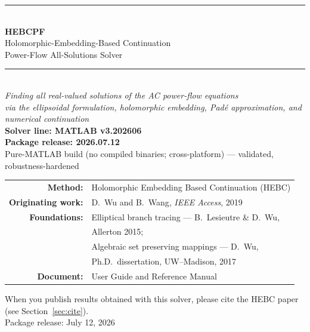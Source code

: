 \documentclass[11pt,a4paper]{article}
\begin{document}
\begin{titlepage}
\centering
\vspace*{2.2cm}
{\color{rule}\rule{\textwidth}{1.2pt}}\\[8pt]
{\Huge\bfseries HEBCPF}\\[10pt]
{\LARGE Holomorphic-Embedding-Based Continuation}\\[4pt]
{\LARGE Power-Flow All-Solutions Solver}\\[10pt]
{\color{rule}\rule{\textwidth}{1.2pt}}\\[18pt]
{\large\itshape Finding \emph{all} real-valued solutions of the AC power-flow equations}\\[6pt]
{\large\itshape via the ellipsoidal formulation, holomorphic embedding, Pad\'e approximation, and numerical continuation}\\[26pt]

{\large\bfseries Solver line: MATLAB v3.202606}\\[2pt]
{\large\bfseries Package release: 2026.07.12}\\[4pt]
{\large Pure-MATLAB build (no compiled binaries; cross-platform) --- validated, robustness-hardened}\\[12pt]

\begin{tabular}{rl}
\textbf{Method:} & Holomorphic Embedding Based Continuation (HEBC)\\[3pt]
\textbf{Originating work:} & D.\ Wu and B.\ Wang, \emph{IEEE Access}, 2019\\[6pt]
\textbf{Foundations:} & Elliptical branch tracing --- B.\ Lesieutre \& D.\ Wu,\\[1pt]
                      & Allerton 2015;\\[3pt]
                      & Algebraic set preserving mappings --- D.\ Wu,\\[1pt]
                      & Ph.D.\ dissertation, UW--Madison, 2017\\[6pt]
\textbf{Document:} & User Guide and Reference Manual\\
\end{tabular}

\vfill
{\small When you publish results obtained with this solver, please cite the HEBC
paper (see Section~\ref{sec:cite}).}\\[6pt]
{\small Package release: July 12, 2026}
\end{titlepage}

\tableofcontents
\newpage
\end{document}
